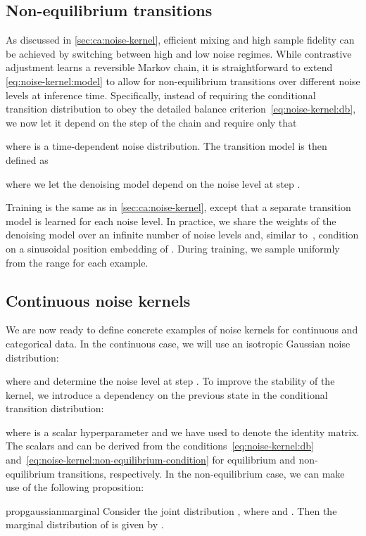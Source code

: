 \documentclass[10pt,twocolumn,letterpaper]{article}
\begin{document}
\subsection{Non-equilibrium transitions}\label{sec:ca:non-equilibrium}

As discussed in \cref{sec:ca:noise-kernel}, efficient mixing and high sample fidelity can be achieved by switching between high and low noise regimes.
While contrastive adjustment learns a reversible Markov chain, it is straightforward to extend \cref{eq:noise-kernel:model} to allow for non-equilibrium transitions over different noise levels at inference time.
Specifically, instead of requiring the conditional transition distribution to obey the detailed balance criterion~\eqref{eq:noise-kernel:db}, we now let it depend on the step  of the chain and require only that

where  is a time-dependent noise distribution.
The transition model is then defined as

where we let the denoising model  depend on the noise level  at step .

Training is the same as in \cref{sec:ca:noise-kernel}, except that a separate transition model is learned for each noise level.
In practice, we share the weights  of the denoising model  over an infinite number of noise levels  and, similar to~\cite{ho2020denoising}, condition  on a sinusoidal position embedding of .
During training, we sample  uniformly from the range  for each example.


\subsection{Continuous noise kernels}\label{sec:nk:continuous}

We are now ready to define concrete examples of noise kernels for continuous and categorical data.
In the continuous case, we will use an isotropic Gaussian noise distribution:

where  and  determine the noise level at step .
To improve the stability of the kernel, we introduce a dependency on the previous state in the conditional transition distribution:

where  is a scalar hyperparameter and we have used  to denote the identity matrix.
The scalars  and  can be derived from the conditions~\eqref{eq:noise-kernel:db} and~\eqref{eq:noise-kernel:non-equilibrium-condition} for equilibrium and non-equilibrium transitions, respectively.
In the non-equilibrium case, we can make use of the following proposition:
\begin{restatable}{prop}{gaussianmarginal}\label{prop:gaussian-marginal}
  Consider the joint distribution , where  and .
  Then the marginal distribution of  is given by .
\end{restatable}
\end{document}

